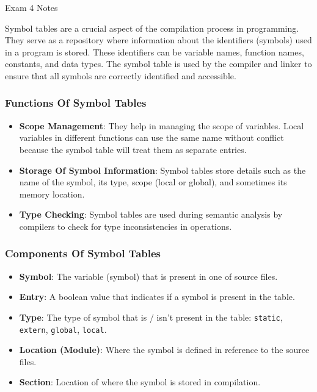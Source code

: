 \begin{examnotes}{Exam 4 Notes}
    \begin{highlight}
        Symbol tables are a crucial aspect of the compilation process in programming. They serve as a repository where information about the identifiers (symbols) used in a program is stored. These 
        identifiers can be variable names, function names, constants, and data types. The symbol table is used by the compiler and linker to ensure that all symbols are correctly identified and accessible.
    
        \subsubsection*{Functions Of Symbol Tables}
    
        \begin{itemize}
            \item \textbf{Scope Management}: They help in managing the scope of variables. Local variables in different functions can use the same name without conflict because the symbol table will treat 
            them as separate entries.
            \item \textbf{Storage Of Symbol Information}: Symbol tables store details such as the name of the symbol, its type, scope (local or global), and sometimes its memory location.
            \item \textbf{Type Checking}: Symbol tables are used during semantic analysis by compilers to check for type inconsistencies in operations.
        \end{itemize}
    
        \subsubsection*{Components Of Symbol Tables}
    
        \begin{itemize}
            \item \textbf{Symbol}: The variable (symbol) that is present in one of source files.
            \item \textbf{Entry}: A boolean value that indicates if a symbol is present in the table.
            \item \textbf{Type}: The type of symbol that is / isn't present in the table: \texttt{static}, \texttt{extern}, \texttt{global}, \texttt{local}.
            \item \textbf{Location (Module)}: Where the symbol is defined in reference to the source files.
            \item \textbf{Section}: Location of where the symbol is stored in compilation.
        \end{itemize}


\end{highlight}
\end{examnotes}
